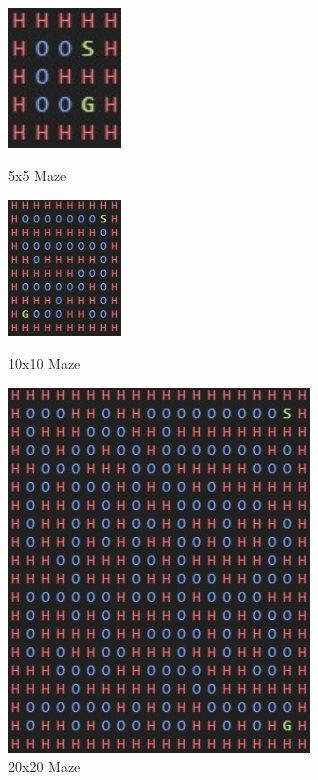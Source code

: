 \documentclass[twoside, 12pt, a4paper]{article}
\begin{document}
\begin{figure}[ht]
\begin{center}
\includegraphics[width=3cm]{5x5.jpg}
\caption{\label{tab:table-name}5x5 Maze}

\includegraphics[width=3cm]{10x10.jpg} 
\caption{\label{tab:table-name}10x10 Maze}

\includegraphics[width=8cm]{20x20.jpg} 
\caption{\label{tab:table-name}20x20 Maze}
\end {center}
\end{figure}
\end{document}
